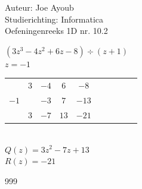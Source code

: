 \documentclass[a4paper]{article}
\begin{document}
  
\noindent \large Auteur: Joe Ayoub \\
\noindent \large Studierichting: Informatica\\
\noindent \large Oefeningenreeks 1D nr. 10.2\\

\medskip

\normalsize

$(3z^3-4z^2+6z-8)\div(z+1)$ \\

$ z = -1 $ \\

\begin{tabular}{c|ccccccccc}
		& $3$ & $-4$ & $6$ & $-8$ \\
$-1$ 	&     & $-3$ & $7$ & $-13$  \\ \hline
		& $3$ & $-7$ & $13$& \vline $ -21$ \\
\end{tabular}\\

$Q(z) = 3z^2-7z+13$ \\

$R(z) = -21$ \\

\begin{thebibliography}{999}
\end{thebibliography}
\end{document}
